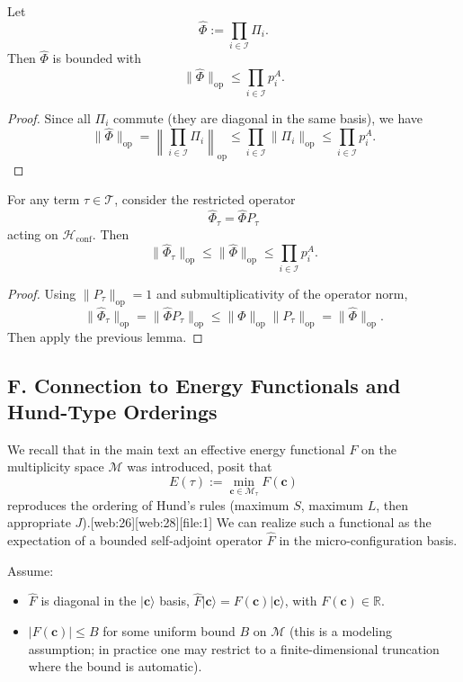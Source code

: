 \documentclass[11pt]{article}
\begin{document}
\begin{lemma}
Let
\[
\widehat{\Phi} := \prod_{i\in\mathcal{I}} \Pi_i.
\]
Then \(\widehat{\Phi}\) is bounded with
\[
\|\widehat{\Phi}\|_{\text{op}} \le \prod_{i\in\mathcal{I}} p_i^{A}.
\]
\end{lemma}

\begin{proof}
Since all \(\Pi_i\) commute (they are diagonal in the same basis), we have
\[
\|\widehat{\Phi}\|_{\text{op}} = \left\| \prod_{i\in\mathcal{I}} \Pi_i \right\|_{\text{op}}
\le \prod_{i\in\mathcal{I}} \|\Pi_i\|_{\text{op}}
\le \prod_{i\in\mathcal{I}} p_i^{A}.
\]
\end{proof}

\begin{corollary}
For any term \(\tau\in\mathcal{T}\), consider the restricted operator
\[
\widehat{\Phi}_\tau = \widehat{\Phi} P_\tau
\]
acting on \(\mathcal{H}_{\text{conf}}\). Then
\[
\|\widehat{\Phi}_\tau\|_{\text{op}} \le \|\widehat{\Phi}\|_{\text{op}} \le \prod_{i\in\mathcal{I}} p_i^{A}.
\]
\end{corollary}

\begin{proof}
Using \(\|P_\tau\|_{\text{op}} = 1\) and submultiplicativity of the operator norm,
\[
\|\widehat{\Phi}_\tau\|_{\text{op}} = \|\widehat{\Phi} P_\tau\|_{\text{op}}
\le \|\widehat{\Phi}\|_{\text{op}} \|P_\tau\|_{\text{op}}
= \|\widehat{\Phi}\|_{\text{op}}.
\]
Then apply the previous lemma.
\end{proof}

\subsection*{F. Connection to Energy Functionals and Hund-Type Orderings}

We recall that in the main text an effective energy functional \(F\) on the multiplicity space \(\mathcal{M}\) was introduced, posit that
\[
E(\tau) := \min_{\mathbf{c}\in\mathcal{M}_\tau} F(\mathbf{c})
\]
reproduces the ordering of Hund's rules (maximum \(S\), maximum \(L\), then appropriate \(J\)).[web:26][web:28][file:1] We can realize such a functional as the expectation of a bounded self-adjoint operator \(\widehat{F}\) in the micro-configuration basis.

Assume:
\begin{itemize}
  \item \(\widehat{F}\) is diagonal in the \(\lvert \mathbf{c} \rangle\) basis, \(\widehat{F} \lvert \mathbf{c} \rangle = F(\mathbf{c}) \lvert \mathbf{c} \rangle\), with \(F(\mathbf{c}) \in \mathbb{R}\).
  \item \(|F(\mathbf{c})| \le B\) for some uniform bound \(B\) on \(\mathcal{M}\) (this is a modeling assumption; in practice one may restrict to a finite-dimensional truncation where the bound is automatic).
\end{itemize}
\end{document}

